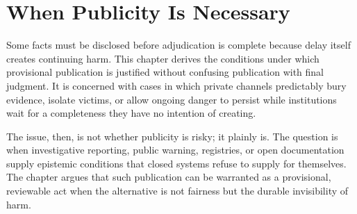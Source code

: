 
\chapter{When Publicity Is Necessary}
\label{ch:ch093}

Some facts must be disclosed before adjudication is complete because delay itself creates continuing harm. This chapter derives the conditions under which provisional publication is justified without confusing publication with final judgment. It is concerned with cases in which private channels predictably bury evidence, isolate victims, or allow ongoing danger to persist while institutions wait for a completeness they have no intention of creating.

The issue, then, is not whether publicity is risky; it plainly is. The question is when investigative reporting, public warning, registries, or open documentation supply epistemic conditions that closed systems refuse to supply for themselves. The chapter argues that such publication can be warranted as a provisional, reviewable act when the alternative is not fairness but the durable invisibility of harm.
